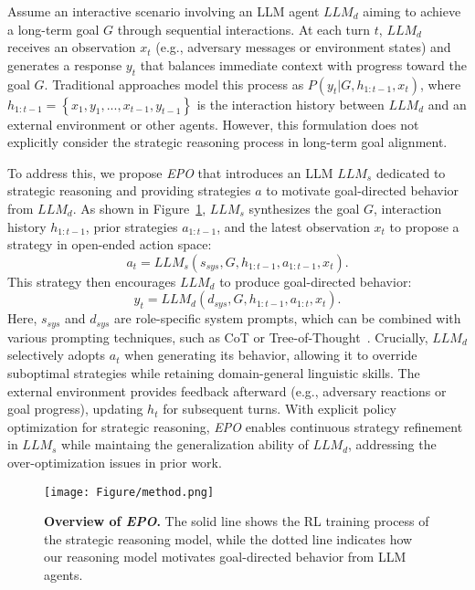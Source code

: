 Assume an interactive scenario involving an LLM agent $LLM_d$ aiming to achieve a long-term goal $G$ through sequential interactions. 
At each turn $t$, $LLM_d$ receives an observation $x_t$ (e.g., adversary messages or environment states) and generates a response $y_t$ that balances immediate context with progress toward the goal $G$. 
Traditional approaches model this process as $P(y_t | G, h_{1:t-1}, x_t)$, where $h_{1:t-1}=\left\{x_1, y_1, ..., x_{t-1}, y_{t-1}\right\}$ is the interaction history between $LLM_d$ and an external environment or other agents. However, this formulation does not explicitly consider the strategic reasoning process in long-term goal alignment.

To address this, we propose \textit{EPO} that introduces an LLM $LLM_s$ dedicated to strategic reasoning and providing strategies $a$ to motivate goal-directed behavior from $LLM_d$.
As shown in Figure~\ref{fig:method}, $LLM_s$ synthesizes the goal $G$, interaction history $h_{1:t-1}$, prior strategies $a_{1:t-1}$, and the latest observation $x_t$ to propose a strategy in open-ended action space:
\begin{equation}
    a_t = LLM_s(s_{sys}, G, h_{1:t-1}, a_{1:t-1}, x_t).
\end{equation}
This strategy then encourages $LLM_d$ to produce goal-directed behavior:
\begin{equation}
    y_t = LLM_d(d_{sys}, G, h_{1:t-1}, a_{1:t}, x_t).
\end{equation}
Here, $s_{sys}$ and $d_{sys}$ are role-specific system prompts, which can be combined with various prompting techniques, such as CoT or Tree-of-Thought~\cite{yao2023tree}.
Crucially, $LLM_d$ selectively adopts $a_t$ when generating its behavior, allowing it to override suboptimal strategies while retaining domain-general linguistic skills. 
The external environment provides feedback afterward (e.g., adversary reactions or goal progress), updating $h_{t}$ for subsequent turns. 
With explicit policy optimization for strategic reasoning, \textit{EPO} enables continuous strategy refinement in $LLM_s$ while maintaing the generalization ability of $LLM_d$, addressing the over-optimization issues in prior work.

\begin{figure}[t]
\centering
\centerline{\texttt{[image: Figure/method.png]}}
\caption{\textbf{Overview of \textit{EPO}.}
The solid line shows the RL training process of the strategic reasoning model, while the dotted line indicates how our reasoning model motivates goal-directed behavior from LLM agents.
}
\label{fig:method}
\end{figure}


